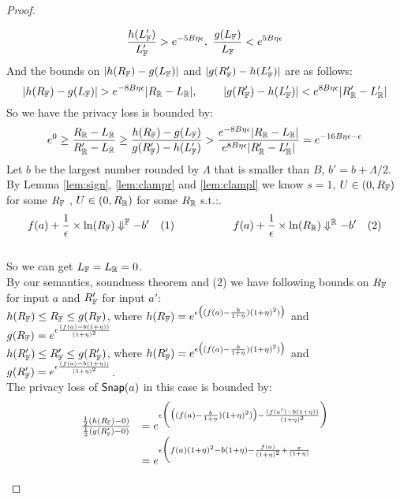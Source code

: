 \documentclass[a4paper,11pt]{article}
\begin{document}
\begin{proof}
\begin{itemize}
\[		%
		\frac{h(\fvalL')}{\fvalL'} > e^{-5B\eta \epsilon}, 
		~ 
		\frac{g(\fvalL)}{\fvalL} < e^{5B\eta \epsilon}
		\]
		And the bounds on $|h(R_{\mathbb{F}}) - g(L_{\mathbb{F}})|$
		and $|g(R_{\mathbb{F}}') - h(L_{\mathbb{F}}')|$ are as follows:
		\[
		|h(R_{\mathbb{F}}) - g(L_{\mathbb{F}})| > e^{-8 B\eta \epsilon}
		|R_{\mathbb{R}} - L_{\mathbb{R}}|, 
		~~~~~~~
		|g(R_{\mathbb{F}}') - h(L_{\mathbb{F}}')| < e^{8 B\eta \epsilon}
		|R_{\mathbb{R}}' - L_{\mathbb{R}}'|
		\]
		So we have the privacy loss is bounded by:
		\[
		e^0 
		\geq 
		\frac{R_{\mathbb{R}} - L_{\mathbb{R}}}{R_{\mathbb{R}}' - L_{\mathbb{R}}}
		\geq
		\frac{h(R_{\mathbb{F}}) - g(L_{\mathbb{F}})}
		{g(R_{\mathbb{F}}') - h(L_{\mathbb{F}}')}
		> \frac{e^{-8 B\eta \epsilon}|R_{\mathbb{R}} - L_{\mathbb{R}}|}
		{e^{8 B\eta \epsilon}|R_{\mathbb{R}}' - L_{\mathbb{R}}'|}
		= e^{-16B \eta \epsilon - \epsilon}
		\]
		Let $b$ be the largest number rounded by $\Lambda$ that is smaller than $B$, $b' = b + \Lambda / 2$.
		\\
		By Lemma \ref{lem:sign}, \ref{lem:clampr} and \ref{lem:clampl} we know $s = 1$, 
		$U \in (0, R_{\mathbb{F}})$ for some $R_{\mathbb{F}}$
		, $U \in (0, R_{\mathbb{R}})$ for some $R_{\mathbb{R}}$ s.t.:.
		$$f(a) + \frac{1}{\epsilon} \times \ln(R_{\mathbb{F}}) \Downarrow^{\mathbb{F}} -b' ~~~ (1)
		~~~~~~~~~~~~~~~~
		f(a) + \frac{1}{\epsilon} \times \ln(R_{\mathbb{R}}) \Downarrow^{\mathbb{R}} -b' ~~~ (2)
		$$
		\\
		So we can get $L_{\mathbb{F}} = L_{\mathbb{R}} = 0$.
		\\
		By our semantics, soundness theorem and (2) we have following bounds on $R_{\mathbb{F}}$ for input $a$ and $R_{\mathbb{F}}'$ for input $a'$:
		\\
		$h(R_{\mathbb{F}}) \leq R_{\mathbb{F}} \leq g(R_{\mathbb{F}})$, where
		$h(R_{\mathbb{F}}) = e^{\epsilon 
		\big( (f(a) -  \frac{b}{1 + \eta}) (1 + \eta)^2) \big)}$
		and
		$g(R_{\mathbb{F}}) = e^{\epsilon 
		\frac{(f(a) - b(1 + \eta))}{(1 + \eta)^2}}$
		\\
		$h(R_{\mathbb{F}}') \leq R_{\mathbb{F}}' \leq g(R_{\mathbb{F}}')$, where
		$h(R_{\mathbb{F}}') = e^{\epsilon 
		\big( (f(a) -  \frac{b}{1 + \eta}) (1 + \eta)^2) \big)}$
		and
		$g(R_{\mathbb{F}}') = e^{\epsilon 
		\frac{(f(a) - b(1 + \eta))}{(1 + \eta)^2}}$.
		\\
		The privacy loss of $\mathsf{Snap}(a)$ in this case is bounded by:
		\[
		\begin{array}{ll}
		\frac
		{\frac{1}{2}(h(R_{\mathbb{F}}) - 0)}
		{\frac{1}{2}(g(R_{\mathbb{F}}') - 0)}
		& = e^{\epsilon
		\bigg(
		\big( (f(a) -  \frac{b}{1 + \eta}) (1 + \eta)^2) \big)
		-
		\frac{(f(a') - b(1 + \eta))}{(1 + \eta)^2}
		\bigg)}\\
		& = e^{\epsilon
		\bigg(
		f(a)(1 + \eta)^2 - b(1 + \eta) 
		- \frac{f(a)}{(1 + \eta)^2} + \frac{x}{(1 + \eta)}   
}
\end{array}\]
\end{itemize}
\end{proof}
\end{document}
